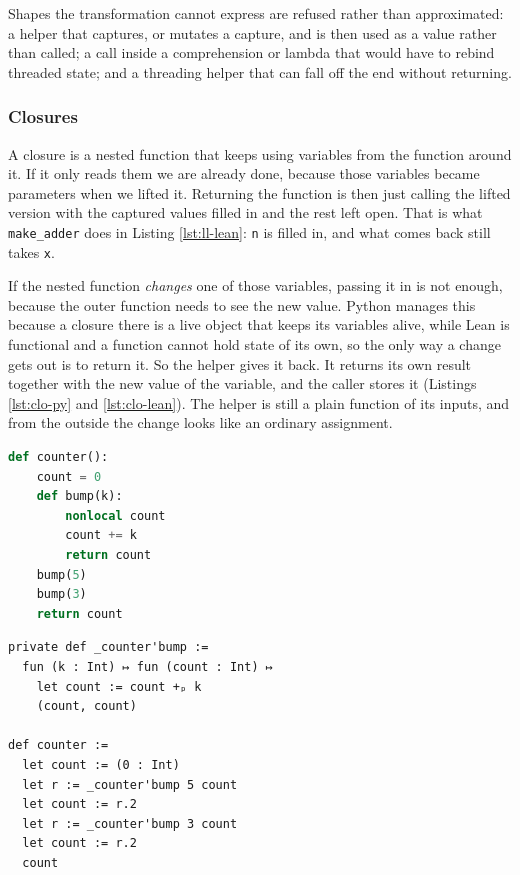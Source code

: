 \documentclass{article}
\newcommand{\code}{\lstinline}
\begin{document}
Shapes the transformation cannot express are refused rather than approximated: a helper that captures, or mutates a capture, and is then used as a value rather than called; a call inside a comprehension or lambda that would have to rebind threaded state; and a threading helper that can fall off the end without returning.

\subsubsection{Closures}

A closure is a nested function that keeps using variables from the function around it. If it only reads them we are already done, because those variables became parameters when we lifted it. Returning the function is then just calling the lifted version with the captured values filled in and the rest left open. That is what \code{make_adder} does in Listing \ref{lst:ll-lean}: \code{n} is filled in, and what comes back still takes \code{x}.

If the nested function \emph{changes} one of those variables, passing it in is not enough, because the outer function needs to see the new value. Python manages this because a closure there is a live object that keeps its variables alive, while Lean is functional and a function cannot hold state of its own, so the only way a change gets out is to return it. So the helper gives it back. It returns its own result together with the new value of the variable, and the caller stores it (Listings \ref{lst:clo-py} and \ref{lst:clo-lean}). The helper is still a plain function of its inputs, and from the outside the change looks like an ordinary assignment.

\noindent
\begin{minipage}[t]{0.44\textwidth}
\begin{lstlisting}[language=python, caption={A closure that writes to a capture.}, label={lst:clo-py}, breaklines=true]
def counter():
    count = 0
    def bump(k):
        nonlocal count
        count += k
        return count
    bump(5)
    bump(3)
    return count
\end{lstlisting}
\end{minipage}%
\hfill
\begin{minipage}[t]{0.52\textwidth}
\begin{lstlisting}[style=lean, caption={The capture is passed in and handed back.}, label={lst:clo-lean}, breaklines=true]
private def _counter'bump :=
  fun (k : Int) ↦ fun (count : Int) ↦
    let count := count +ₚ k
    (count, count)

def counter :=
  let count := (0 : Int)
  let r := _counter'bump 5 count
  let count := r.2
  let r := _counter'bump 3 count
  let count := r.2
  count
\end{lstlisting}
\end{minipage}
\end{document}
